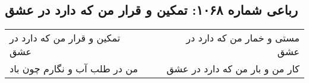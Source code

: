 \begin{center}
\section*{رباعی شماره ۱۰۶۸: تمکین و قرار من که دارد در عشق}
\label{sec:1068}
\begin{longtable}{l p{0.5cm} r}
تمکین و قرار من که دارد در عشق
&&
مستی و خمار من که دارد در عشق
\\
من در طلب آب و نگارم چون باد
&&
کار من و بار من که دارد در عشق
\\
\end{longtable}
\end{center}
